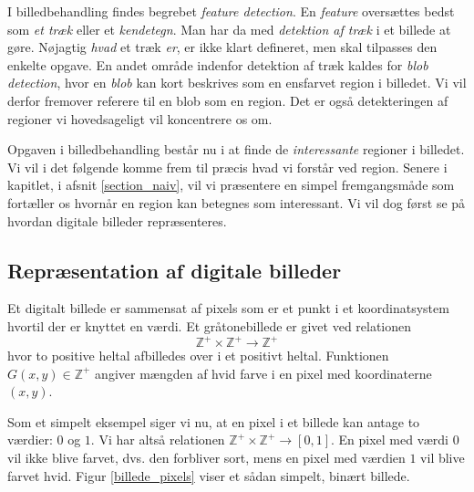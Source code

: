 {
{\sffamily I billedbehandling findes begrebet \emph{feature detection}.
En \emph{feature} oversættes bedst som \emph{et træk} eller et
\emph{kendetegn}. Man har da med \emph{detektion af træk} i et billede
at gøre. Nøjagtig \emph{hvad} et træk \emph{er}, er ikke klart
defineret, men skal tilpasses den enkelte opgave. En andet område
indenfor detektion af træk kaldes for \emph{blob detection}, hvor en
\emph{blob} kan kort beskrives som en ensfarvet region i billedet. Vi
vil derfor fremover referere til en blob som en region. Det er også
detekteringen af regioner vi hovedsageligt vil koncentrere os om.

Opgaven i billedbehandling består nu i at finde de \emph{interessante}
regioner i billedet. Vi vil i det følgende komme frem til præcis hvad vi
forstår ved region. Senere i kapitlet, i afsnit \ref{section_naiv}, vil
vi præsentere en simpel fremgangsmåde som fortæller os hvornår en region
kan betegnes som interessant. Vi vil dog først se på hvordan digitale billeder
repræsenteres.
}

\subsection{Repræsentation af digitale billeder}
Et digitalt billede er sammensat af pixels som er et punkt i et
koordinatsystem hvortil der er knyttet en værdi. Et gråtonebillede er
givet ved relationen
\begin{equation}
    \mathbb{Z}^{+}\times{} \mathbb{Z}^{+} \rightarrow \mathbb{Z}^{+}
\end{equation}
hvor to positive heltal afbilledes over i et positivt heltal.
Funktionen $G(x, y) \in \mathbb{Z}^{+}$ angiver mængden af hvid farve i
en pixel med koordinaterne $(x, y)$.

Som et simpelt eksempel siger vi nu, at en pixel i et billede kan antage
to værdier: $0$ og $1$. Vi har altså relationen $\mathbb{Z}^{+}\times{}
\mathbb{Z}^{+} \rightarrow [0, 1]$. En pixel med værdi $0$ vil ikke
blive farvet, dvs. den forbliver sort, mens en pixel med værdien $1$ vil
blive farvet hvid.  Figur \ref{billede_pixels} viser et sådan simpelt,
binært billede.

}
